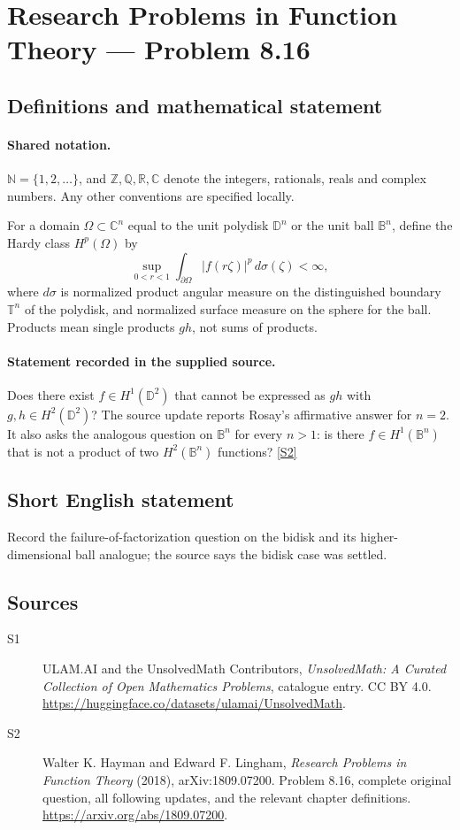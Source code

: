 \documentclass[11pt]{book}
\newcommand{\sref}[2]{\hyperlink{source:#1:#2}{[S#2]}}
\begin{document}
\section{Research Problems in Function Theory — Problem 8.16}\label{statement}

\subsection{Definitions and mathematical statement}

\paragraph{Shared notation.}$\mathbb N=\{1,2,\ldots\}$, and $\mathbb Z,\mathbb Q,\mathbb R,\mathbb C$ denote the integers, rationals, reals and complex numbers. Any other conventions are specified locally.


For a domain $\Omega\subset\mathbb C^n$ equal to the unit polydisk $\mathbb D^n$ or the unit ball $\mathbb B^n$, define the Hardy class $H^p(\Omega)$ by \[\sup_{0<r<1}\int_{\partial\Omega}|f(r\zeta)|^p\,d\sigma(\zeta)<\infty,\] where $d\sigma$ is normalized product angular measure on the distinguished boundary $\mathbb T^n$ of the polydisk, and normalized surface measure on the sphere for the ball. Products mean single products $gh$, not sums of products.
\paragraph{Statement recorded in the supplied source.}
Does there exist $f\in H^1(\mathbb D^2)$ that cannot be expressed as $gh$ with $g,h\in H^2(\mathbb D^2)$? The source update reports Rosay’s affirmative answer for $n=2$. It also asks the analogous question on $\mathbb B^n$ for every $n>1$: is there $f\in H^1(\mathbb B^n)$ that is not a product of two $H^2(\mathbb B^n)$ functions? \sref{statement}{2}
\subsection{Short English statement}
Record the failure-of-factorization question on the bidisk and its higher-dimensional ball analogue; the source says the bidisk case was settled.
\subsection{Sources}
\begin{description}
\item[\hypertarget{source:statement:1}{S1}] ULAM.AI and the UnsolvedMath Contributors, \emph{UnsolvedMath: A Curated Collection of Open Mathematics Problems}, catalogue entry. CC BY 4.0. \url{https://huggingface.co/datasets/ulamai/UnsolvedMath}.
\item[\hypertarget{source:statement:2}{S2}] Walter K. Hayman and Edward F. Lingham, \emph{Research Problems in Function Theory} (2018), arXiv:1809.07200. Problem 8.16, complete original question, all following updates, and the relevant chapter definitions. \url{https://arxiv.org/abs/1809.07200}.
\end{description}
\label{end:statement}
\end{document}
